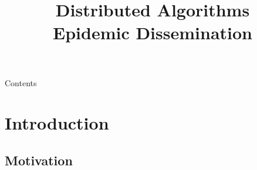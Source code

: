 
\title[DS - Epidemic Dissemination]{\textbf{Distributed Algorithms}\\Epidemic Dissemination}



\newcommand{\Value}{\mathit{value}}
\newcommand{\Time}{\fontvar{time}}
\newcommand{\Now}{\fontproc{now}}
\newcommand{\Random}{\fontproc{random}}
\newcommand{\Update}{\textsc{update}\xspace}
\newcommand{\Push}{\textsc{push}\xspace}
\newcommand{\Pull}{\textsc{pull}\xspace}
\newcommand{\ReplyPull}{\textsc{reply}\xspace}
\newcommand{\PushPull}{\textsc{pushpull}\xspace}
\newcommand{\ReplyPushPull}{\textsc{reply}\xspace}


\FrameTitle
\begin{frame}[shrink]{Contents}
\tableofcontents
\end{frame}

\section{Introduction}

\subsection{Motivation}

